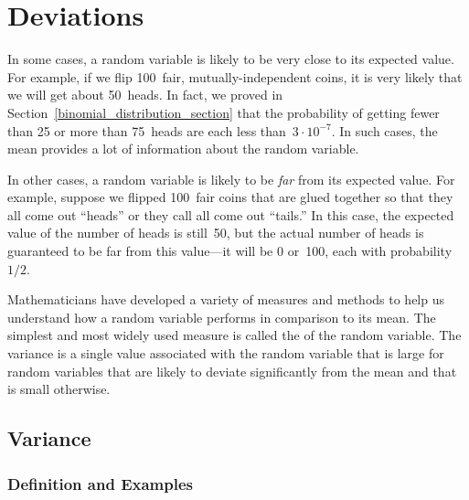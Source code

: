 \chapter{Deviations}\label{chap:deviations}

In some cases, a random variable is likely to be very close to its
expected value.  For example, if we flip 100~fair,
mutually-independent coins, it is very likely that we will get about
50~heads.  In fact, we proved in
Section~\ref{binomial_distribution_section} that the probability of
getting fewer than 25 or more than 75~heads are each less than~$3
\cdot 10^{-7}$.  In such cases, the mean provides a lot of information
about the random variable.

In other cases, a random variable is likely to be \emph{far} from its
expected value.  For example, suppose we flipped 100~fair coins that
are glued together so that they all come out ``heads'' or they call
all come out ``tails.''  In this case, the expected value of the
number of heads is still~50, but the actual number of heads is
guaranteed to be far from this value---it will be 0 or~100, each with
probability~$1/2$.

Mathematicians have developed a variety of measures and methods to help
us understand how a random variable performs in comparison to its
mean.  The simplest and most widely used measure is called the
 of the random variable.  The variance is a single
value associated with the random variable that is large for random
variables that are likely to deviate significantly from the mean and
that is small otherwise.

\section{Variance}\label{sec:variance}

\subsection{Definition and Examples}

